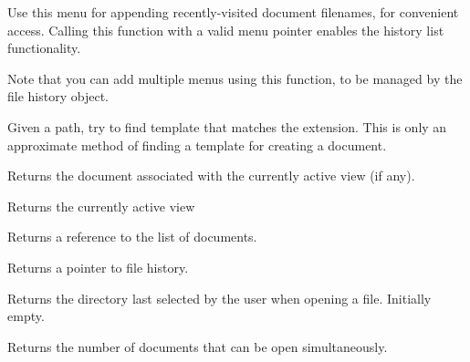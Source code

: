 
Use this menu for appending recently-visited document filenames, for convenient
access. Calling this function with a valid menu pointer enables the history
list functionality.

Note that you can add multiple menus using this function, to be managed by the
file history object.

\label{wxdocmanagerfindtemplateforpath}


Given a path, try to find template that matches the extension. This is only
an approximate method of finding a template for creating a document.

\label{wxdocmanagergetcurrentdocument}


Returns the document associated with the currently active view (if any).

\label{wxdocmanagergetcurrentview}


Returns the currently active view 

\label{wxdocmanagergetdocuments}


Returns a reference to the list of documents.

\label{wxdocmanagergetfilehistory}


Returns a pointer to file history.

\label{wxdocmanagergetlastdirectory}


Returns the directory last selected by the user when opening a file. Initially empty.

\label{wxdocmanagergetmaxdocsopen}


Returns the number of documents that can be open simultaneously.


